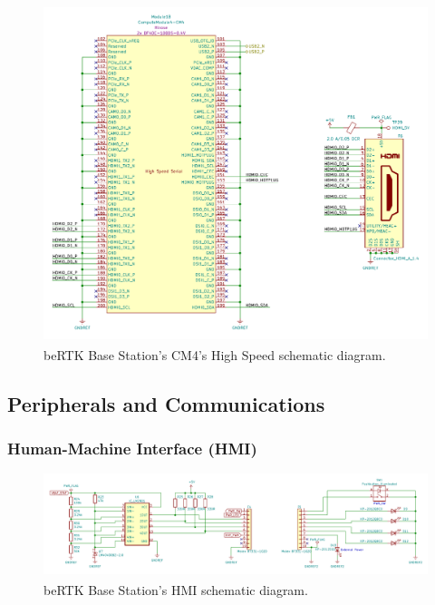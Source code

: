 \begin{figure}[h]
	\centering
	\includegraphics[width=1.0\textwidth]{Chapters/Figures/chapter3/CM4_HighSpeed.pdf}
	\caption{beRTK\textsuperscript{\textregistered} Base Station's CM4's High Speed schematic diagram.}
	\label{fig:CM4_HighSpeed_circuit}
\end{figure}

\subsection{Peripherals and Communications}\label{sec:323_PERIPHERALS_COMMS}

\subsubsection{Human-Machine Interface (HMI)}\label{sec:3231_BACKPANEL}

\begin{figure}[h]
	\centering
	\includegraphics[width=1.0\textwidth]{Chapters/Figures/chapter3/Back_Panel.pdf}
	\caption{beRTK\textsuperscript{\textregistered} Base Station's HMI schematic diagram.}
	\label{fig:HMI_circuit}
\end{figure}

